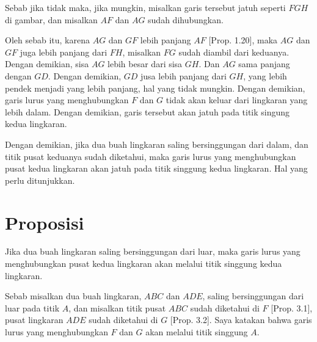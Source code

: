 \documentclass[a4paper]{book}
\begin{document}
Sebab jika tidak maka, jika mungkin, misalkan garis tersebut jatuh seperti
$FGH$ di gambar, dan misalkan $AF$ dan $AG$ sudah dihubungkan. 

Oleh sebab itu, karena $AG$ dan $GF$ lebih panjang $AF$ [Prop. 1.20],
maka $AG$ dan $GF$ juga lebih panjang dari $FH$, misalkan $FG$ sudah
diambil dari keduanya. Dengan demikian, sisa $AG$ lebih besar dari
sisa $GH$. Dan $AG$ sama panjang dengan $GD$. Dengan demikian, $GD$
jusa lebih panjang dari $GH$, yang lebih pendek menjadi yang lebih
panjang, hal yang tidak mungkin. Dengan demikian, garis lurus yang 
menghubungkan $F$ dan $G$ tidak akan keluar dari lingkaran yang lebih
dalam. Dengan demikian, garis tersebut akan jatuh pada titik singung
kedua lingkaran.

Dengan demikian, jika dua buah lingkaran saling bersinggungan dari dalam, dan
titik pusat keduanya sudah diketahui, maka garis lurus yang menghubungkan
pusat kedua lingkaran akan jatuh pada titik singgung kedua lingkaran. 
Hal yang perlu ditunjukkan.

\section*{\centering Proposisi \thesection}
Jika dua buah lingkaran saling bersinggungan dari luar, maka
garis lurus yang menghubungkan pusat kedua lingkaran akan melalui
titik singgung kedua lingkaran.  
\begin{center}
\end{center} 
Sebab misalkan dua buah lingkaran, $ABC$ dan $ADE$, saling bersinggungan
dari luar pada titik $A$, dan misalkan titik pusat $ABC$ sudah
diketahui di $F$ [Prop. 3.1], pusat lingkaran $ADE$ sudah diketahui 
di $G$ [Prop. 3.2]. Saya katakan bahwa garis lurus yang menghubungkan
$F$ dan $G$ akan melalui titik singgung $A$.
\end{document}
